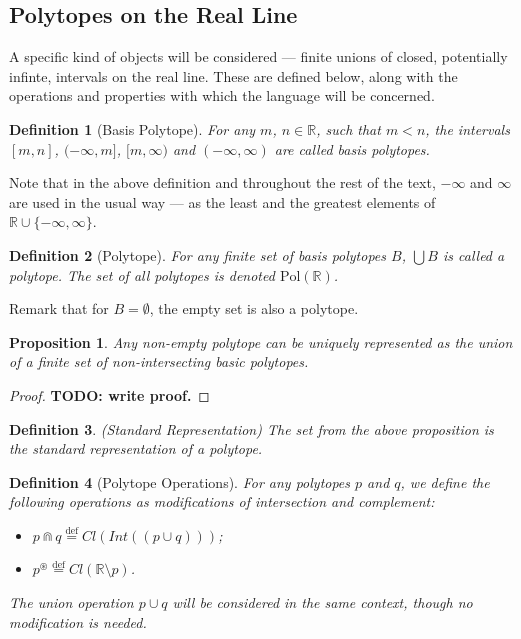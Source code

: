 \documentclass{article}
\newtheorem*{definition}{Definition}
\newtheorem*{proposition}{Proposition}
\newcommand{\R}{\mathbb{R}}
\newcommand{\bcup}{\cup}
\newcommand{\bcap}{\Cap}
\newcommand{\bstar}{^\circledast}
\newcommand{\Pol}{\text{Pol}}
\newcommand{\eqdef}{\stackrel{\text{def}}{=}}
\begin{document}
\subsection{Polytopes on the Real Line}

A specific kind of objects will be considered --- finite unions of closed, potentially infinte, intervals on the real line. These are defined below, along with the operations and properties with which the language will be concerned.

\begin{definition}[Basis Polytope]
For any $m$, $n \in \mathbb{R}$, such that $m < n$, the intervals $[m, n]$, $(-\infty, m]$, $[m, \infty)$ and $(-\infty, \infty)$ are called \emph{basis polytopes}.
\end{definition}

Note that in the above definition and throughout the rest of the text, $-\infty$ and $\infty$ are used in the usual way --- as the least and the greatest elements of $\R \cup \{-\infty, \infty\}$.

\begin{definition}[Polytope]
For any finite set of basis polytopes $B$, $\bigcup B$ is called a \emph{polytope}. The set of all polytopes is denoted $\Pol(\R)$.
\end{definition}

Remark that for $B = \emptyset$, the empty set is also a polytope.

\begin{proposition}
Any non-empty polytope can be uniquely represented as the union of a finite set of non-intersecting basic polytopes.
\end{proposition}
\begin{proof}
  \textbf{TODO: write proof.}
\end{proof}

\begin{definition}(Standard Representation)
The set from the above proposition is the \emph{standard representation} of a polytope.
\end{definition}

\begin{definition}[Polytope Operations]
For any polytopes $p$ and $q$, we define the following operations as modifications of intersection and complement:
\begin{itemize}
  \item $p \bcap q \eqdef Cl(Int((p \cup q)))$;
  \item $p \bstar \eqdef Cl(\R \setminus p) $.
\end{itemize}
The union operation $p \bcup q$ will be considered in the same context, though no modification is needed.
\end{definition}
\end{document}
